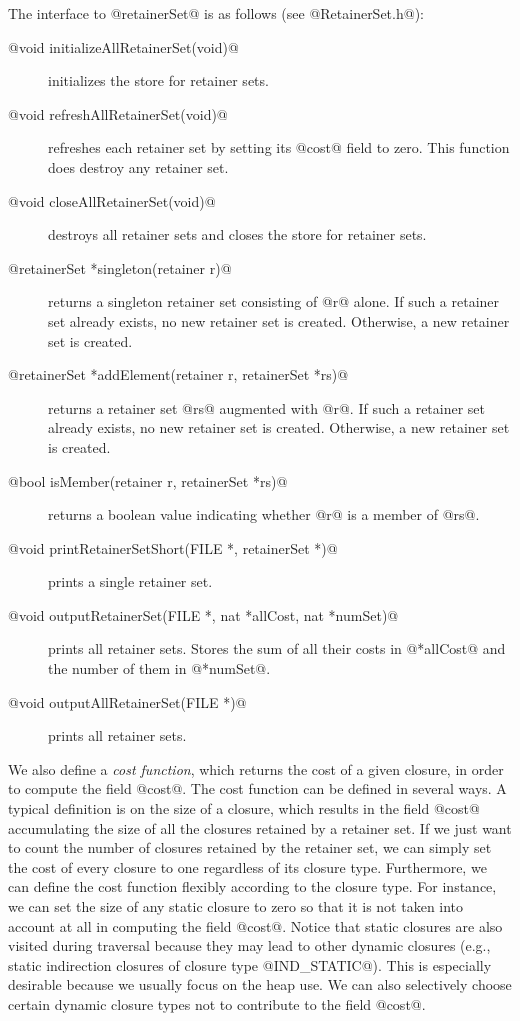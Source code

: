 \documentclass{article}
\begin{document}
The interface to @retainerSet@ is as follows 
(see @RetainerSet.h@):

\begin{description}
\item[@void initializeAllRetainerSet(void)@] initializes the store for retainer sets.
\item[@void refreshAllRetainerSet(void)@] refreshes each retainer set by setting
its @cost@ field to zero. This function does destroy any retainer set.
\item[@void closeAllRetainerSet(void)@] destroys all retainer sets and closes
the store for retainer sets.
\item[@retainerSet *singleton(retainer r)@] returns a singleton retainer set
consisting of @r@ alone. If such a retainer set already exists, no new retainer
set is created. Otherwise, a new retainer set is created.
\item[@retainerSet *addElement(retainer r, retainerSet *rs)@] returns a retainer set
@rs@ augmented with @r@. If such a retainer set already exists, no new retainer set
is created. Otherwise, a new retainer set is created.
\item[@bool isMember(retainer r, retainerSet *rs)@] returns a boolean value
indicating whether @r@ is a member of @rs@.
\item[@void printRetainerSetShort(FILE *, retainerSet *)@] prints a single retainer
set.
\item[@void outputRetainerSet(FILE *, nat *allCost, nat *numSet)@] prints all 
retainer sets. Stores the sum of all their costs in @*allCost@ and the number
of them in @*numSet@.
\item[@void outputAllRetainerSet(FILE *)@] prints all retainer sets.
\end{description}

We also define a \emph{cost function}, which returns the cost of a given closure, 
in order to compute the field @cost@. 
The cost function can be defined in several ways.
A typical definition is on the size of a closure, which results in
the field @cost@ accumulating the size of all the closures retained by a
retainer set.
If we just want to count the number of closures retained by the
retainer set, we can simply set the cost of every closure to one regardless
of its closure type.
Furthermore, we can define the cost function flexibly according to
the closure type. 
For instance, we can set the size of any static closure to zero so that
it is not taken into account at all in computing the field @cost@. 
Notice that static closures are also visited during traversal because they 
may lead to other dynamic closures (e.g., static indirection closures of 
closure type @IND_STATIC@).
This is especially desirable because we usually focus on the heap use.
We can also selectively choose certain dynamic closure types not to contribute 
to the field @cost@.
\end{document}
